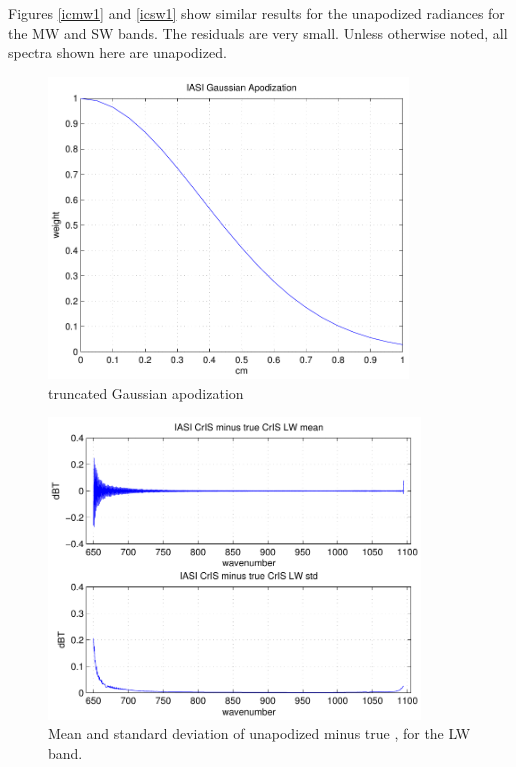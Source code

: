\documentclass[12pt]{article}
\begin{document}
Figures \ref{icmw1} and \ref{icsw1} show similar results for the
unapodized radiances for the MW and SW bands. The residuals are very
small.  Unless otherwise noted, all {\cris} spectra shown here are
unapodized.

\begin{figure}
  \centering
  \includegraphics[height=8cm]{figures/iasi_gauss_app.pdf}
  \caption{{\iasi} truncated Gaussian apodization}
  \label{igauss}
\end{figure}

\begin{figure}
  \centering
  \includegraphics[height=8cm]{figures/iasi_cris_lw_1.pdf}
  \caption{Mean and standard deviation of unapodized {\iasi} {\cris}
    minus true {\cris}, for the {\cris} LW band.}
  \label{iclw1}
\end{figure}
\end{document}
